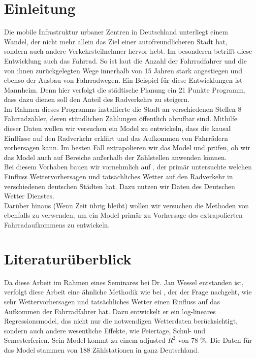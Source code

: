 \documentclass[a4paper,12pt]{thesis}
\begin{document}
\newpage

\begingroup
\let\clearpage\relax
\listoffigures
\listoftables
\endgroup






\chapter{Einleitung}

Die mobile Infrastruktur urbaner Zentren in Deutschland unterliegt einem Wandel, der nicht mehr allein das Ziel einer autofreundlicheren Stadt hat, sondern auch andere Verkehrsteilnehmer hervor hebt. Im besonderen betrifft diese Entwicklung auch das Fahrrad. So ist laut \cite{Nobis2019} die Anzahl der Fahrradfahrer und die von ihnen zurückgelegten Wege innerhalb von 15 Jahren stark angestiegen und ebenso der Ausbau von Fahrradwegen. Ein Beispiel für diese Entwicklungen ist Mannheim. Denn hier verfolgt die städtische Planung ein 21 Punkte Programm, dass dazu dienen soll den Anteil des Radverkehrs zu steigern.\\
Im Rahmen dieses Programms installierte die Stadt an verschiedenen Stellen 8 Fahrradzähler, deren stündlichen Zählungen öffentlich abrufbar sind. Mithilfe dieser Daten wollen wir versuchen ein Model zu entwickeln, dass die kausal Einflüsse auf den Radverkehr erklärt und das Aufkommen von Fahrrädern vorhersagen kann. Im besten Fall extrapolieren wir das Model und prüfen, ob wir das Model auch auf Bereiche außerhalb der Zählstellen anwenden können.\\
Bei diesem Vorhaben bauen wir vornehmlich auf \cite{Wessel2020}, der primär untersuchte welchen Einfluss Wettervorhersagen und tatsächliches Wetter auf den Radverkehr in verschiedenen deutschen Städten hat. Dazu nutzen wir Daten des Deutschen Wetter Dienstes.\\
Darüber hinaus (Wenn Zeit übrig bleibt) wollen wir versuchen die Methoden von \cite{PRATI201744} ebenfalls zu verwenden, um ein Model primär zu Vorhersage des extrapolierten Fahrradaufkommens zu entwickeln.

\chapter{Literaturüberblick}

Da diese Arbeit im Rahmen eines Seminares bei Dr. Jan Wessel entstanden ist, verfolgt diese Arbeit eine ähnliche Methodik wie bei \cite{Wessel2020}, der der Frage nachgeht, wie sehr Wettervorhersagen und tatsächliches Wetter einen Einfluss auf das Aufkommen der Fahrradfahrer hat. Dazu entwickelt er ein log-lineares Regressionsmodel, das nicht nur die notwendigen Wetterdaten berücksichtigt, sondern auch andere wesentliche Effekte, wie Feiertage, Schul- und Semesterferien. Sein Model kommt zu einem adjusted $R^2$ von 78 \%. Die Daten für das Model stammen von 188 Zählstationen in ganz Deutschland.\\
\end{document}

